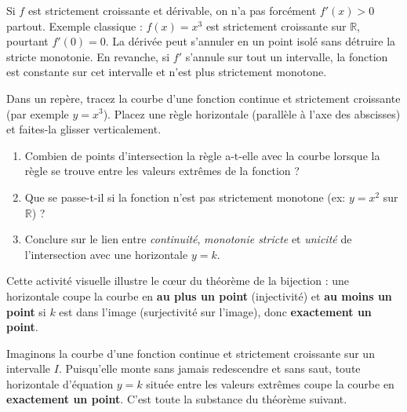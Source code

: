 \documentclass[11pt]{article}
\newcounter{popsec}
\newcounter{popsub}
\newcommand{\courssub}[1]{%
  \stepcounter{popsub}%
  \par\vspace{9pt}\noindent{\popxbold\fontsize{11.5}{13}\selectfont\color{popink}{\color{poporange}\thepopsec.\thepopsub}\hspace{6pt}#1}\par\nopagebreak\vspace{4pt}
}
\begin{document}
\begin{attention}
Si $f$ est strictement croissante et dérivable, on n'a pas forcément $f'(x) > 0$ partout. Exemple classique : $f(x) = x^3$ est strictement croissante sur $\mathbb{R}$, pourtant $f'(0) = 0$. La dérivée peut s'annuler en un point isolé sans détruire la stricte monotonie. En revanche, si $f'$ s'annule sur tout un intervalle, la fonction est constante sur cet intervalle et n'est plus strictement monotone.
\end{attention}

\begin{experience}
Dans un repère, tracez la courbe d'une fonction continue et strictement croissante (par exemple $y=x^3$). Placez une règle horizontale (parallèle à l'axe des abscisses) et faites-la glisser verticalement.
\begin{enumerate}
\item Combien de points d'intersection la règle a-t-elle avec la courbe lorsque la règle se trouve entre les valeurs extrêmes de la fonction ?
\item Que se passe-t-il si la fonction n'est pas strictement monotone (ex: $y=x^2$ sur $\mathbb{R}$) ?
\item Conclure sur le lien entre \emph{continuité}, \emph{monotonie stricte} et \emph{unicité} de l'intersection avec une horizontale $y=k$.
\end{enumerate}
Cette activité visuelle illustre le cœur du théorème de la bijection : une horizontale coupe la courbe en \textbf{au plus un point} (injectivité) et \textbf{au moins un point} si $k$ est dans l'image (surjectivité sur l'image), donc \textbf{exactement un point}.
\end{experience}

\courssub{Le théorème de la bijection}

Imaginons la courbe d'une fonction continue et strictement croissante sur un intervalle $I$. Puisqu'elle monte sans jamais redescendre et sans saut, toute horizontale d'équation $y = k$ située entre les valeurs extrêmes coupe la courbe en \textbf{exactement un point}. C'est toute la substance du théorème suivant.
\end{document}
